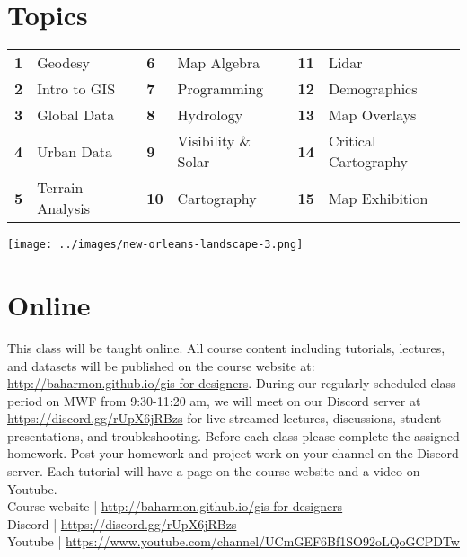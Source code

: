 \documentclass[11pt,article,oneside]{memoir}
\begin{document}
\section{Topics}

\begin{table}[H]
\begin{tabular}{l l @{\hskip 0.5cm} l l @{\hskip 0.5cm} l l}
\small
\textbf{1} & Geodesy & \textbf{6} & Map Algebra & \textbf{11} & Lidar\\
\textbf{2} & Intro to GIS & \textbf{7} & Programming & \textbf{12} & Demographics\\
\textbf{3} & Global Data & \textbf{8} & Hydrology & \textbf{13} & Map Overlays\\
\textbf{4} & Urban Data & \textbf{9} & Visibility \& Solar & \textbf{14} & Critical Cartography\\
\textbf{5} & Terrain Analysis & \textbf{10} & Cartography & \textbf{15} & Map Exhibition\\
\end{tabular}
\end{table}

\vspace*{1em}

\texttt{[image: ../images/new-orleans-landscape-3.png]}

\clearpage

\section{Online}

This class will be taught online.
All course content including tutorials, lectures, and datasets
will be published on the course website at:
\url{http://baharmon.github.io/gis-for-designers}.
During our regularly scheduled class period on MWF from 9:30-11:20 am,
we will meet on our Discord server at \url{https://discord.gg/rUpX6jRBzs}
for live streamed lectures, discussions, student presentations, and troubleshooting. 
Before each class please complete the assigned homework. 
Post your homework and project work 
on your channel on the Discord server. 
Each tutorial will have a page on the course website
and a video on Youtube.\\

\noindent
Course website | \url{http://baharmon.github.io/gis-for-designers}\\
Discord | \url{https://discord.gg/rUpX6jRBzs}\\
Youtube | \url{https://www.youtube.com/channel/UCmGEF6Bf1SO92oLQoGCPDTw}\\
\end{document}

